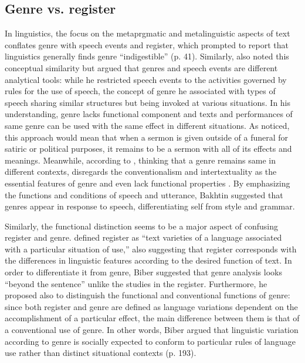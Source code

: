 \documentclass[12pt, draft]{article}
\begin{document}
\subsection{Genre vs. register}
In linguistics, the focus on the metaprgmatic and metalinguistic aspects of text conflates genre with speech events and register, which prompted \textcite{swales1990} to report that linguistics generally finds genre ``indigestible'' (p. 41). Similarly, \textcite{hymes1974} also noted this conceptual similarity but argued that genres and speech events are different analytical tools: while he restricted speech events to the activities governed by rules for the use of speech, the concept of genre he associated with types of speech sharing similar structures but being invoked at various situations. In his understanding, genre lacks functional component and texts and performances of same genre can be used with the same effect in different situations. As \textcite{swales1990} noticed, this approach would mean that when a sermon is given outside of a funeral for satiric or political purposes, it remains to be a sermon with all of its effects and meanings. Meanwhile, according to \textcite{bakhtin1986}, thinking that a genre remains same in different contexts, disregards the conventionalism and intertextuality as the essential features of genre and even lack functional properties . By emphasizing the functions and conditions of speech and utterance, Bakhtin suggested that genres appear in response to speech, differentiating self from style and grammar.  

Similarly, the functional distinction seems to be a major aspect of confusing register and genre. \textcite[p. 191]{biber2012} defined register as ``text varieties of a language associated with a particular situation of use,'' also suggesting that register corresponds with the differences in linguistic features according to the desired function of text. In order to differentiate it from genre, Biber suggested that genre analysis looks ``beyond the sentence'' unlike the studies in the register. Furthermore, he proposed also to distinguish the functional and conventional functions of genre: since both register and genre are defined as language variations dependent on the accomplishment of a particular effect, the main difference between them is that of a conventional use of genre. In other words, Biber argued that linguistic variation according to genre is socially expected to conform to particular rules of language use rather than distinct situational contexts (p. 193). 
\end{document}
